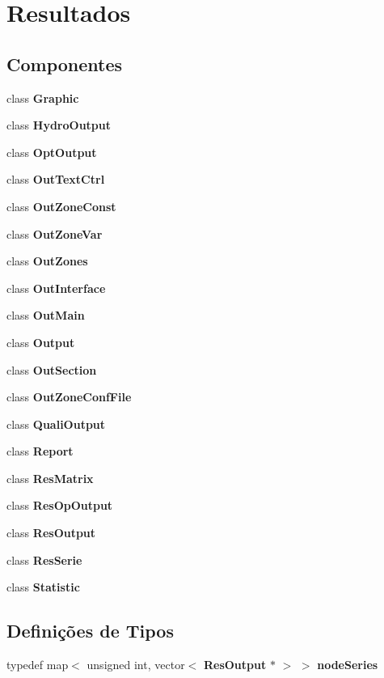 \section{Resultados}
\label{group___resultados}
\subsection*{Componentes}
\begin{DoxyCompactItemize}
\item 
class {\bf Graphic}
\item 
class {\bf Hydro\+Output}
\item 
class {\bf Opt\+Output}
\item 
class {\bf Out\+Text\+Ctrl}
\item 
class {\bf Out\+Zone\+Const}
\item 
class {\bf Out\+Zone\+Var}
\item 
class {\bf Out\+Zones}
\item 
class {\bf Out\+Interface}
\item 
class {\bf Out\+Main}
\item 
class {\bf Output}
\item 
class {\bf Out\+Section}
\item 
class {\bf Out\+Zone\+Conf\+File}
\item 
class {\bf Quali\+Output}
\item 
class {\bf Report}
\item 
class {\bf Res\+Matrix}
\item 
class {\bf Res\+Op\+Output}
\item 
class {\bf Res\+Output}
\item 
class {\bf Res\+Serie}
\item 
class {\bf Statistic}
\end{DoxyCompactItemize}
\subsection*{Definições de Tipos}
\begin{DoxyCompactItemize}
\item 
typedef map$<$ unsigned int, vector$<$ {\bf Res\+Output} $\ast$ $>$ $>$ {\bf node\+Series}
\end{DoxyCompactItemize}
